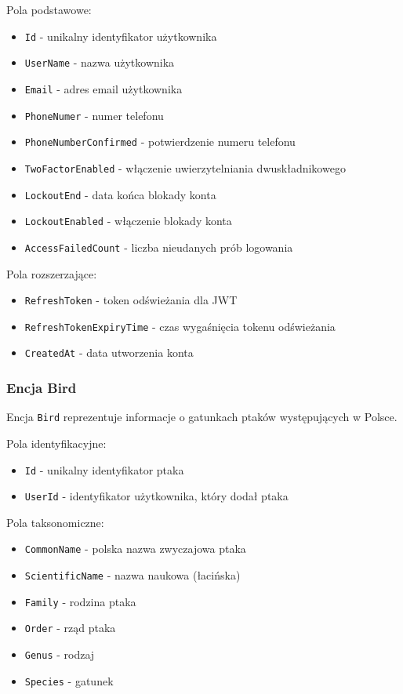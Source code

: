 Pola podstawowe:
\begin{itemize}
	\item \texttt{Id} - unikalny identyfikator użytkownika
	\item \texttt{UserName} - nazwa użytkownika
	\item \texttt{Email} - adres email użytkownika
	\item \texttt{PhoneNumer} - numer telefonu
	\item \texttt{PhoneNumberConfirmed} - potwierdzenie numeru telefonu
	\item \texttt{TwoFactorEnabled} - włączenie uwierzytelniania dwuskładnikowego
	\item \texttt{LockoutEnd} - data końca blokady konta
	\item \texttt{LockoutEnabled} - włączenie blokady konta
	\item \texttt{AccessFailedCount} - liczba nieudanych prób logowania
\end{itemize}
Pola rozszerzające:
\begin{itemize}
	\item \texttt{RefreshToken} - token odświeżania dla JWT
	\item \texttt{RefreshTokenExpiryTime} - czas wygaśnięcia tokenu odświeżania
	\item \texttt{CreatedAt} - data utworzenia konta
\end{itemize}

\subsubsection{Encja Bird}
Encja \texttt{Bird} reprezentuje informacje o gatunkach ptaków występujących w Polsce.

Pola identyfikacyjne:
\begin{itemize}
	\item \texttt{Id} - unikalny identyfikator ptaka
	\item \texttt{UserId} - identyfikator użytkownika, który dodał ptaka
\end{itemize}

Pola taksonomiczne:
\begin{itemize}
	\item \texttt{CommonName} - polska nazwa zwyczajowa ptaka
	\item \texttt{ScientificName} - nazwa naukowa (łacińska)
	\item \texttt{Family} - rodzina ptaka
	\item \texttt{Order} - rząd ptaka
	\item \texttt{Genus} - rodzaj
	\item \texttt{Species} - gatunek
\end{itemize}

